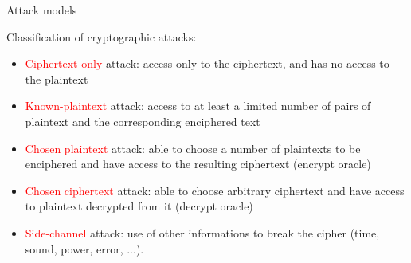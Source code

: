 \begin{frame}{Attack models}

Classification of cryptographic attacks:

\medskip

\begin{itemize}
  \item \textcolor{red}{Ciphertext-only} attack: access only to the ciphertext, and has no access to the plaintext
  \medskip
  \item \textcolor{red}{Known-plaintext} attack: access to at least a limited number of pairs of plaintext and the corresponding enciphered text
  \medskip
  \item \textcolor{red}{Chosen plaintext} attack: able to choose a number of plaintexts to be enciphered and have access to the resulting ciphertext (encrypt oracle)
  \medskip
  \item \textcolor{red}{Chosen ciphertext} attack: able to choose arbitrary ciphertext and have access to plaintext decrypted from it (decrypt oracle) 
  \medskip
  \item \textcolor{red}{Side-channel} attack: use of other informations to break the cipher (time, sound, power, error, ...).
\end{itemize}
  
\end{frame}

